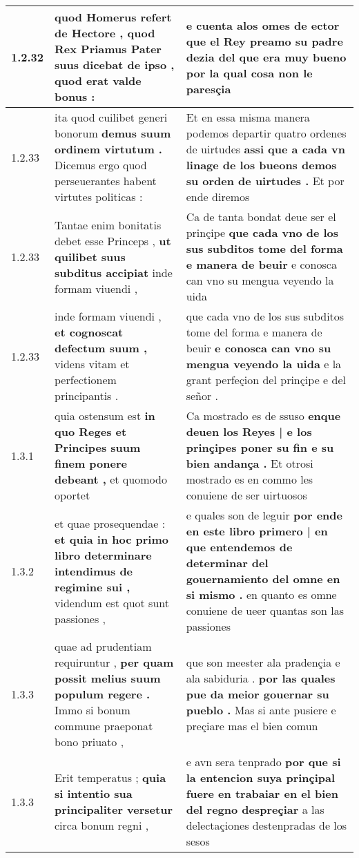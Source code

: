 \begin{tabular}{|p{1cm}|p{6.5cm}|p{6.5cm}|}
1.2.32 & quod Homerus refert de Hectore , \textbf{ quod Rex Priamus Pater suus dicebat de ipso , } quod erat valde bonus : & e cuenta alos omes de ector \textbf{ que el Rey preamo su padre dezia del que era muy bueno } por la qual cosa non le paresçia \\\hline
1.2.33 & ita quod cuilibet generi bonorum \textbf{ demus suum ordinem virtutum . } Dicemus ergo quod perseuerantes habent virtutes politicas : & Et en essa misma manera podemos departir quatro ordenes de uirtudes \textbf{ assi que a cada vn linage de los bueons demos su orden de uirtudes . } Et por ende diremos \\\hline
1.2.33 & Tantae enim bonitatis debet esse Princeps , \textbf{ ut quilibet suus subditus accipiat } inde formam viuendi , & Ca de tanta bondat deue ser el prinçipe \textbf{ que cada vno de los sus subditos tome del forma e manera de beuir } e conosca can vno su mengua veyendo la uida \\\hline
1.2.33 & inde formam viuendi , \textbf{ et cognoscat defectum suum , } videns vitam et perfectionem principantis . & que cada vno de los sus subditos tome del forma e manera de beuir \textbf{ e conosca can vno su mengua veyendo la uida } e la grant perfeçion del prinçipe e del señor . \\\hline
1.3.1 & quia ostensum est \textbf{ in quo Reges et Principes suum finem ponere debeant , } et quomodo oportet & Ca mostrado es de ssuso \textbf{ enque deuen los Reyes | e los prinçipes poner su fin e su bien andança . } Et otrosi mostrado es en commo les conuiene de ser uirtuosos \\\hline
1.3.2 & et quae prosequendae : \textbf{ et quia in hoc primo libro determinare intendimus de regimine sui , } videndum est quot sunt passiones , & e quales son de leguir \textbf{ por ende en este libro primero | en que entendemos de determinar del gouernamiento del omne en si mismo . } en quanto es omne conuiene de ueer quantas son las passiones \\\hline
1.3.3 & quae ad prudentiam requiruntur , \textbf{ per quam possit melius suum populum regere . } Immo si bonum commune praeponat bono priuato , & que son meester ala pradençia e ala sabiduria . \textbf{ por las quales pue da meior gouernar su pueblo . } Mas si ante pusiere e preçiare mas el bien comun \\\hline
1.3.3 & Erit temperatus ; \textbf{ quia si intentio sua principaliter versetur } circa bonum regni , & e avn sera tenprado \textbf{ por que si la entencion suya prinçipal fuere en trabaiar en el bien del regno despreçiar } a las delectaçiones destenpradas de los sesos \\\hline

\end{tabular}
